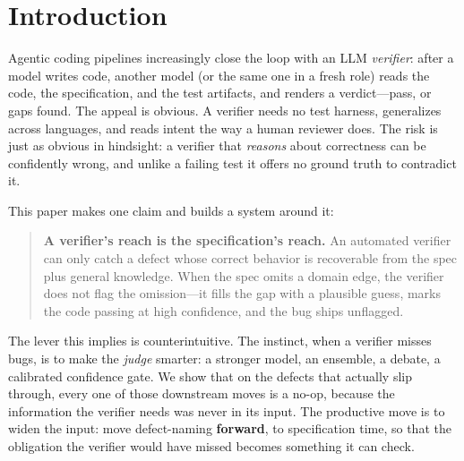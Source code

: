 \documentclass[11pt]{article}
\begin{document}
\section{Introduction}

Agentic coding pipelines increasingly close the loop with an LLM \emph{verifier}: after a model
writes code, another model (or the same one in a fresh role) reads the code, the specification, and
the test artifacts, and renders a verdict---pass, or gaps found. The appeal is obvious. A verifier
needs no test harness, generalizes across languages, and reads intent the way a human reviewer does.
The risk is just as obvious in hindsight: a verifier that \emph{reasons} about correctness can be
confidently wrong, and unlike a failing test it offers no ground truth to contradict it.

This paper makes one claim and builds a system around it:

\begin{quote}
\textbf{A verifier's reach is the specification's reach.} An automated verifier can only catch a
defect whose correct behavior is recoverable from the spec plus general knowledge. When the spec
omits a domain edge, the verifier does not flag the omission---it fills the gap with a plausible
guess, marks the code passing at high confidence, and the bug ships unflagged.
\end{quote}

The lever this implies is counterintuitive. The instinct, when a verifier misses bugs, is to make
the \emph{judge} smarter: a stronger model, an ensemble, a debate, a calibrated confidence gate. We
show that on the defects that actually slip through, every one of those downstream moves is a no-op,
because the information the verifier needs was never in its input. The productive move is to widen
the input: move defect-naming \textbf{forward}, to specification time, so that the obligation the
verifier would have missed becomes something it can check.
\end{document}
